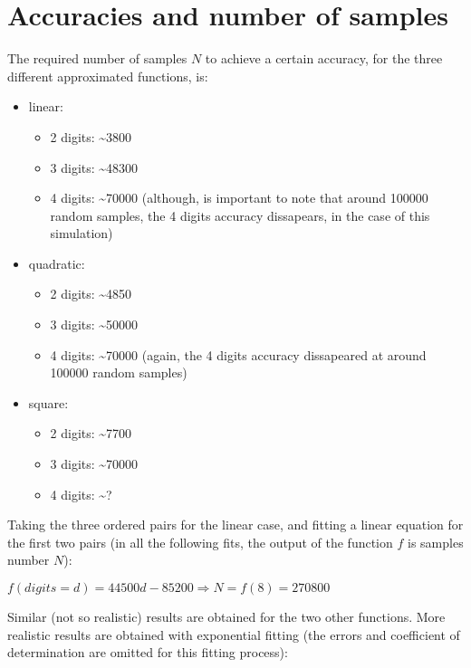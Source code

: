 \documentclass[paper=a4, fontsize=11pt]{scrartcl} %
\numberwithin{equation}{section} %
\numberwithin{figure}{section} %
\numberwithin{table}{section} %
\begin{document}
\section{Accuracies and number of samples}

The required number of samples $N$ to achieve a certain accuracy, for the three different approximated functions, is:

\begin{itemize}
\item linear:
\begin{itemize}
\item 2 digits: \textasciitilde 3800
\item 3 digits: \textasciitilde 48300
\item 4 digits: \textasciitilde 70000 (although, is important to note that around 100000 random samples, the 4 digits accuracy dissapears, in the case of this simulation)
\end{itemize}
\item quadratic: 
\begin{itemize}
\item 2 digits: \textasciitilde 4850
\item 3 digits: \textasciitilde 50000
\item 4 digits: \textasciitilde 70000 (again, the 4 digits accuracy dissapeared at around 100000 random samples)
\end{itemize}
\item square:
\begin{itemize}
\item 2 digits: \textasciitilde 7700
\item 3 digits: \textasciitilde 70000
\item 4 digits: \textasciitilde ?
\end{itemize}
\end{itemize}


Taking the three ordered pairs for the linear case, and fitting a linear equation for the first two pairs (in all the following fits, the output of the function $f$ is samples number $N$):

$f(digits = d) = 44500d - 85200 \Rightarrow N = f(8) = 270800 $

Similar (not so realistic) results are obtained for the two other functions. More realistic results are obtained with exponential fitting (the errors and coefficient of determination are omitted for this fitting process):
\end{document}
